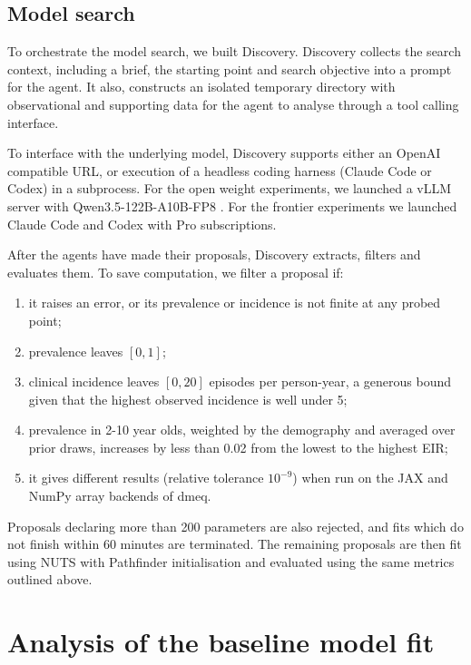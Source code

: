 \documentclass[11pt]{article}
\begin{document}
\subsection{Model search}

To orchestrate the model search, we built Discovery. Discovery collects the search context, including a brief, the starting point and search objective into a prompt for the agent. It also, constructs an isolated temporary directory with observational and supporting data for the agent to analyse through a tool calling interface.

To interface with the underlying model, Discovery supports either an OpenAI compatible URL, or execution of a headless coding harness (Claude Code or Codex) in a subprocess. For the open weight experiments, we launched a vLLM server with Qwen3.5-122B-A10B-FP8 \citep{qwen}. For the frontier experiments we launched Claude Code and Codex with Pro subscriptions.

After the agents have made their proposals, Discovery extracts, filters and evaluates them. To save computation, we filter a proposal if:
\begin{enumerate}
    \item it raises an error, or its prevalence or incidence is not finite at any probed point;
    \item prevalence leaves $[0, 1]$;
    \item clinical incidence leaves $[0, 20]$ episodes per person-year, a generous bound given that the highest observed incidence is well under 5;
    \item prevalence in 2-10 year olds, weighted by the demography and averaged over prior draws, increases by less than 0.02 from the lowest to the highest EIR;
    \item it gives different results (relative tolerance $10^{-9}$) when run on the JAX and NumPy array backends of dmeq.
\end{enumerate}

Proposals declaring more than 200 parameters are also rejected, and fits which do not finish within 60 minutes are terminated. The remaining proposals are then fit using NUTS with Pathfinder initialisation and evaluated using the same metrics outlined above.

\section{Analysis of the baseline model fit}
\end{document}
